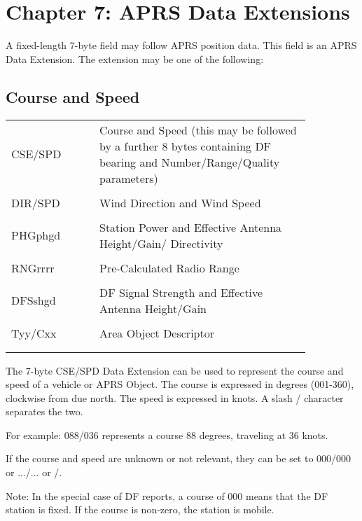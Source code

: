 
\chapter{Chapter 7: APRS Data Extensions}


A fixed-length 7-byte field may follow APRS position data. This field is an
APRS Data Extension. The extension may be one of the following:

\section{Course and Speed}

\begin{tabular}{p{0.25\linewidth}  p{0.6\linewidth}}

 CSE/SPD & Course and Speed (this may be followed by a further 8 bytes
 containing DF bearing and Number/Range/Quality parameters) \\
  & \\
 DIR/SPD & Wind Direction and Wind Speed \\
  & \\
 PHGphgd & Station Power and Effective Antenna Height/Gain/
Directivity \\
  & \\
 RNGrrrr & Pre-Calculated Radio Range \\
  & \\
 DFSshgd & DF Signal Strength and Effective Antenna Height/Gain \\
  & \\
 Tyy/Cxx & Area Object Descriptor \\
 & \\
 & \\
\end{tabular}


The 7-byte CSE/SPD Data Extension can be used to represent the course and
speed of a vehicle or APRS Object.
The course is expressed in degrees (001-360), clockwise from due north. The
speed is expressed in knots. A slash / character separates the two.

For example:
088/036 represents a course 88 degrees, traveling at 36 knots.

If the course and speed are unknown or not relevant, they can be set
to 000/000 or
.../... or \textvisiblespace \textvisiblespace \textvisiblespace
/\textvisiblespace \textvisiblespace \textvisiblespace .

Note: In the special case of DF reports, a course of 000 means that the DF
station is fixed. If the course is non-zero, the station is mobile.

